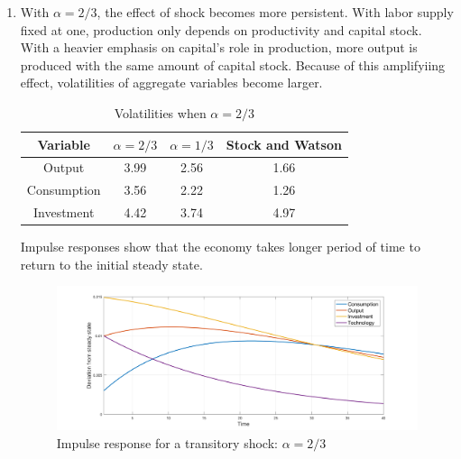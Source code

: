 \documentclass[11pt]{amsart}
\begin{document}
\begin{enumerate}[label = (\alph*)]
    \item With $\alpha = 2/3$, the effect of shock becomes more persistent. With labor supply fixed at one, production only depends on productivity and capital stock. With a heavier emphasis on capital's role in production, more output is produced with the same amount of capital stock. Because of this amplifyiing effect, volatilities of aggregate variables become larger.  
    \begin{table}[H]
    	\centering
    	\begin{tabular}{cccc}
    		\hline \hline 
    		\bf Variable  &$\alpha = 2/3$ & \bf$\alpha=1/3$          & \bf Stock and Watson \\
    		\hline 
    		Output            &   3.99  &  2.56       &   1.66      \\
    		Consumption  &   3.56  &   2.22      &   1.26         \\
    		Investment      &   4.42  &   3.74      &    4.97       \\
    		\hline
    	\end{tabular}
    	\caption{Volatilities when $\alpha = 2/3$}
    \end{table}
    Impulse responses show that the economy takes longer period of time to return to the initial steady state. 
    \begin{figure}[H]
    	\centering
    	\includegraphics[width=1\textwidth]{5d_Minki.png}
    	\caption{Impulse response for a transitory shock: $\alpha = 2/3$}
    \end{figure}
\end{enumerate}
\end{document}
